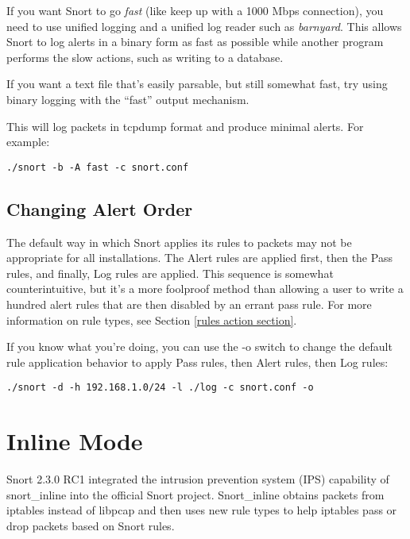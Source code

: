 \documentclass[english]{report}
\begin{document}
If you want Snort to go \emph{fast} (like keep up with a 1000 Mbps connection),
you need to use unified logging and a unified log reader such as
\emph{barnyard}.  This allows Snort to log alerts in a binary form as fast as
possible while another program performs the slow actions, such as writing to a
database.

If you want a text file that's easily parsable, but still somewhat fast, try
using binary logging with the ``fast'' output mechanism. 

This will log packets in tcpdump format and produce minimal alerts. For
example:

\begin{center}
\begin{verbatim}
./snort -b -A fast -c snort.conf
\end{verbatim}
\end{center}

\subsection{Changing Alert Order}

The default way in which Snort applies its rules to packets may not be
appropriate for all installations.  The Alert rules are applied first, then the
Pass rules, and finally, Log rules are applied. This sequence is somewhat
counterintuitive, but it's a more foolproof method than allowing a user to
write a hundred alert rules that are then disabled by an errant pass rule.  For
more information on rule types, see Section \ref{rules action section}.

If you know what you're doing, you can use the -o switch to change the default
rule application behavior to apply Pass rules, then Alert rules, then Log
rules:
\begin{center}
\begin{verbatim}
./snort -d -h 192.168.1.0/24 -l ./log -c snort.conf -o
\end{verbatim}
\end{center}


\section{Inline Mode\label{Snort Inline}}

Snort 2.3.0 RC1 integrated the intrusion prevention system (IPS) capability of
snort\_inline into the official Snort project. Snort\_inline obtains packets
from iptables instead of libpcap and then uses new rule types to help iptables
pass or drop packets based on Snort rules.  
\end{document}
